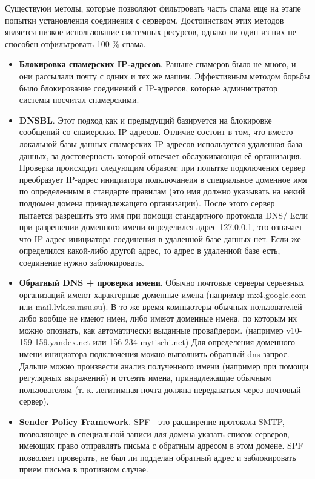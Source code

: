 Существуюи методы, которые позволяют фильтровать часть спама еще на этапе попытки установления соединения с сервером. Достоинством этих методов является низкое использование системных ресурсов, однако ни один из них не способен отфильтровать 100 \% спама.
\begin{itemize}
\item \textbf{Блокировка спамерских IP-адресов}. Раньше спамеров было не много, и они рассылали почту с одних и тех же машин. Эффективным методом борьбы было блокирование соединений с IP-адресов, которые администратор системы посчитал спамерскими.

\item \textbf{DNSBL}\cite{MCMILLAN}. Этот подход как и предыдущий базируется на блокировке сообщений со спамерских IP-адресов. Отличие состоит в том, что вместо локальной базы данных спамерских IP-адресов используется удаленная база данных, за достоверность которой отвечает обслуживающая её организация. Проверка происходит следующим образом: при попытке подключения сервер преобразует IP-адрес инициатора подключанеия в специальное доменное имя по определенным в стандарте правилам (это имя должно указывать на некий поддомен домена принадлежащего организации). После этого сервер пытается разрешить это имя при помощи стандартного протокола DNS/ Если при разрешении доменного имени определился адрес 127.0.0.1, это означает что IP-адрес инициатора соединения в удаленной базе данных нет. Если же определился какой-либо другой адрес, то адрес в удаленной базе есть, соединение нужно заблокировать.

\item \textbf{Обратный DNS + проверка имени}. Обычно почтовые серверы серьезных организаций имеют характерные доменные имена (например mx4.google.com или mail.lvk.cs.msu.su). В то же время компьютеры обычных пользователей либо вообще не имеют имен, либо имеют доменные имена, по которым их можно опознать, как автоматически выданные провайдером. (например v10-159-159.yandex.net или 156-234-mytischi.net) Для определения доменного имени инициатора подключения можно выполнить обратный dns-запрос. Дальше можно произвести анализ полученного имени (например при помощи регулярных выражений) и отсеять имена, принадлежащие обычным пользователям (т. к. легитимная почта должна передаваться через почтовый сервер). 

\item \textbf{Sender Policy Framework}. \cite{SPF} SPF - это расширение протокола SMTP\cite{RFC2081}, позволяющее в специальной записи для домена указать список серверов, имеющих право отправлять письма с обратным адресом в этом домене. SPF позволяет проверить, не был ли подделан обратный адрес и заблокировать прием письма в противном случае.

\end{itemize}
